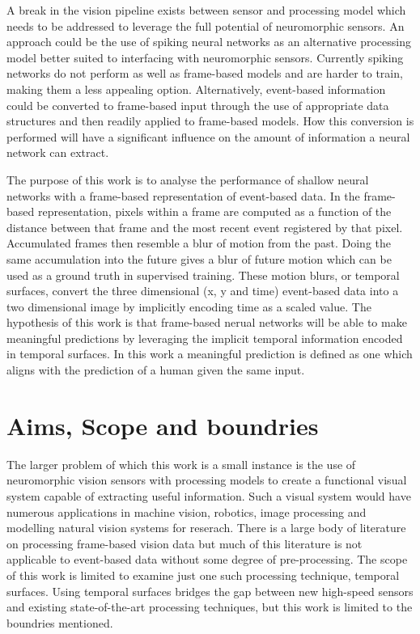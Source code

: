 A break in the vision pipeline exists between sensor and processing model which needs to be addressed to leverage the full potential of neuromorphic sensors. 
An approach could be the use of spiking neural networks as an alternative processing model better suited to interfacing with neuromorphic sensors.
Currently spiking networks do not perform as well as frame-based models and are harder to train, making them a less appealing option.
Alternatively, event-based information could be converted to frame-based input through the use of appropriate data structures and then readily applied to frame-based models. 
How this conversion is performed will have a significant influence on the amount of information a neural network can extract.

The purpose of this work is to analyse the performance of shallow neural networks with a frame-based representation of event-based data.
In the frame-based representation, pixels within a frame are computed as a function of the distance between that frame and the most recent event registered by that pixel. 
Accumulated frames then resemble a blur of motion from the past. 
Doing the same accumulation into the future gives a blur of future motion which can be used as a ground truth in supervised training.
These motion blurs, or temporal surfaces, convert the three dimensional (x, y and time) event-based data into a two dimensional image by implicitly encoding time as a scaled value.
The hypothesis of this work is that frame-based nerual networks will be able to make meaningful predictions by leveraging the implicit temporal information encoded in temporal surfaces. 
In this work a meaningful prediction is defined as one which aligns with the prediction of a human given the same input.  


\section{Aims, Scope and boundries}
The larger problem of which this work is a small instance is the use of neuromorphic vision sensors with processing models to create a functional visual system capable of extracting useful information. 
Such a visual system would have numerous applications in machine vision, robotics, image processing and modelling natural vision systems for reserach. 
There is a large body of literature on processing frame-based vision data but much of this literature is not applicable to event-based data without some degree of pre-processing. 
The scope of this work is limited to examine just one such processing technique, temporal surfaces.
Using temporal surfaces bridges the gap between new high-speed sensors and existing state-of-the-art processing techniques, but this work is limited to the boundries mentioned.

